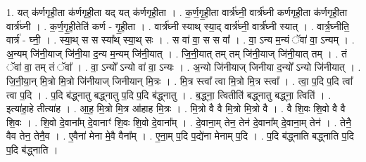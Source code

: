 \documentclass[17pt]{extarticle}
\begin{document}
1. यत् क॑र्णगृही॒ता क॑र्णगृही॒ता यद् यत् क॑र्णगृही॒ता । . क॒र्ण॒गृ॒ही॒ता वार्त्र॑घ्नी॒ वार्त्र॑घ्नी कर्णगृही॒ता क॑र्णगृही॒ता वार्त्र॑घ्नी । . क॒र्ण॒गृ॒ही॒तेति॑ कर्ण - गृ॒ही॒ता । . वार्त्र॑घ्नी स्याथ् स्या॒द् वार्त्र॑घ्नी॒ वार्त्र॑घ्नी स्यात् । . वार्त्र॒घ्नीति॒ वार्त्र॑ - घ्नी॒ । . स्या॒थ् स स स्या᳚थ् स्या॒थ् सः । . स वा॑ वा॒ स स वा᳚ । . वा॒ ऽन्य म॒न्यं ॅवा॑ वा॒ ऽन्यम् । . अ॒न्यम् जि॑नी॒याज् जि॑नी॒या द॒न्य म॒न्यम् जि॑नी॒यात् । . जि॒नी॒यात् तम् तम् जि॑नी॒याज् जि॑नी॒यात् तम् । . तं ॅवा॑ वा॒ तम् तं ॅवा᳚ । . वा॒ ऽन्यो᳚ ऽन्यो वा॑ वा॒ ऽन्यः । . अ॒न्यो जि॑नीयाज् जिनीया द॒न्यो᳚ ऽन्यो जि॑नीयात् । . जि॒नी॒या॒न् मि॒त्रो मि॒त्रो जि॑नीयाज् जिनीयान् मि॒त्रः । . मि॒त्र स्त्वा᳚ त्वा मि॒त्रो मि॒त्र स्त्वा᳚ । . त्वा॒ प॒दि प॒दि त्वा᳚ त्वा प॒दि । . प॒दि ब॑द्ध्नातु बद्ध्नातु प॒दि प॒दि ब॑द्ध्नातु । . ब॒द्ध्ना॒ त्वितीति॑ बद्ध्नातु बद्ध्ना॒ त्विति॑ । . इत्या॑हा॒हे तीत्या॑ह । . आ॒ह॒ मि॒त्रो मि॒त्र आ॑हाह मि॒त्रः । . मि॒त्रो वै वै मि॒त्रो मि॒त्रो वै । . वै शि॒वः शि॒वो वै वै शि॒वः । . शि॒वो दे॒वाना᳚म् दे॒वानाꣳ॑ शि॒वः शि॒वो दे॒वाना᳚म् । . दे॒वाना॒म् तेन॒ तेन॑ दे॒वाना᳚म् दे॒वाना॒म् तेन॑ । . तेनै॒ वैव तेन॒ तेनै॒व । . ए॒वैना॑ मेना मे॒वै वैना᳚म् । . ए॒ना॒म् प॒दि प॒द्ये॑ना मेनाम् प॒दि । . प॒दि ब॑द्ध्नाति बद्ध्नाति प॒दि प॒दि ब॑द्ध्नाति । \newline
\end{document}
